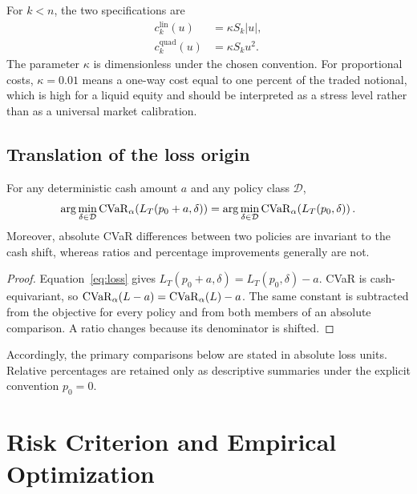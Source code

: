 For $k<n$, the two specifications are
\begin{align}
  c_k^{\mathrm{lin}}(u)&=\kappa S_k|u|,
  \label{eq:lin_cost}\\
  c_k^{\mathrm{quad}}(u)&=\kappa S_k u^2.
  \label{eq:quad_cost}
\end{align}
The parameter $\kappa$ is dimensionless under the chosen convention. For
proportional costs, $\kappa=0.01$ means a one-way cost equal to one percent of
the traded notional, which is high for a liquid equity and should be interpreted
as a stress level rather than as a universal market calibration.

\subsection{Translation of the loss origin}

\begin{proposition}
For any deterministic cash amount $a$ and any policy class $\mathcal{D}$,
\[
  \arg\min_{\delta\in\mathcal{D}}
  \operatorname{CVaR}_{\alpha}\!\left(L_T(p_0+a,\delta)\right)
  =
  \arg\min_{\delta\in\mathcal{D}}
  \operatorname{CVaR}_{\alpha}\!\left(L_T(p_0,\delta)\right).
\]
Moreover, absolute CVaR differences between two policies are invariant to the
cash shift, whereas ratios and percentage improvements generally are not.
\end{proposition}

\begin{proof}
Equation~\eqref{eq:loss} gives
$L_T(p_0+a,\delta)=L_T(p_0,\delta)-a$. CVaR is cash-equivariant, so
$\operatorname{CVaR}_{\alpha}(L-a)=\operatorname{CVaR}_{\alpha}(L)-a$. The same constant is subtracted
from the objective for every policy and from both members of an absolute
comparison. A ratio changes because its denominator is shifted.
\end{proof}

Accordingly, the primary comparisons below are stated in absolute loss units.
Relative percentages are retained only as descriptive summaries under the
explicit convention $p_0=0$.


\section{Risk Criterion and Empirical Optimization}
\label{sec:cvar}

